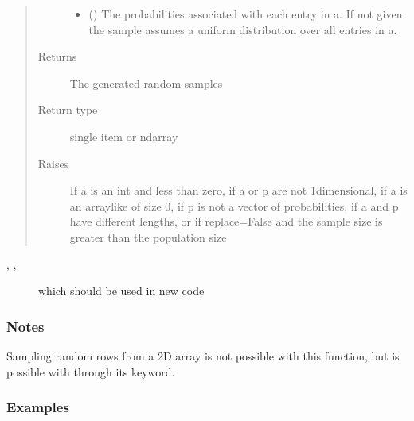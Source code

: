 \documentclass[letterpaper,10pt,english]{sphinxmanual}
\begin{document}
\begin{fulllineitems}
\begin{quote}
\begin{description}
\begin{itemize}
\item {}
\sphinxAtStartPar
{} (\sphinxstyleliteralemphasis{\sphinxupquote{, }}) \textendash{} The probabilities associated with each entry in a.
If not given the sample assumes a uniform distribution over all
entries in a.

\end{itemize}

\item[{Returns}] \leavevmode
\sphinxAtStartPar
{} \textendash{} The generated random samples

\item[{Return type}] \leavevmode
\sphinxAtStartPar
single item or ndarray

\item[{Raises}] \leavevmode
\sphinxAtStartPar
{} \textendash{} If a is an int and less than zero, if a or p are not 1\sphinxhyphen{}dimensional,
    if a is an array\sphinxhyphen{}like of size 0, if p is not a vector of
    probabilities, if a and p have different lengths, or if
    replace=False and the sample size is greater than the population
    size

\end{description}\end{quote}


\nopagebreak


\sphinxAtStartPar
{}, , 
\begin{description}
\item[{}] \leavevmode
\sphinxAtStartPar
which should be used in new code

\end{description}


\subsubsection*{Notes}

\sphinxAtStartPar
Sampling random rows from a 2\sphinxhyphen{}D array is not possible with this function,
but is possible with  through its  keyword.
\subsubsection*{Examples}


\end{fulllineitems}
\end{document}

